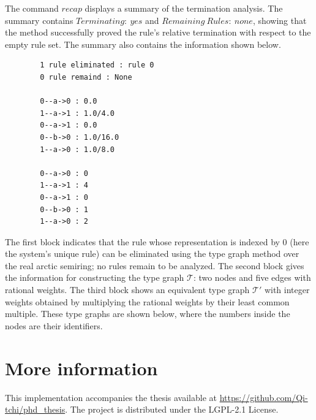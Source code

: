 The command \colorbox{Ivory2}{$recap$} displays a summary of the termination analysis. The summary contains \colorbox{Ivory2}{$Terminating:\ yes$} and \colorbox{Ivory2}{$Remaining\ Rules:\ none$}, showing that the method successfully proved the rule's relative termination with respect to the empty rule set. 
The summary also contains the information shown below.
\begin{center}
    \begin{lstlisting} 
        1 rule eliminated : rule 0 
        0 rule remaind : None

        0--a->0 : 0.0
        1--a->1 : 1.0/4.0 
        0--a->1 : 0.0
        0--b->0 : 1.0/16.0 
        1--a->0 : 1.0/8.0 

        0--a->0 : 0
        1--a->1 : 4
        0--a->1 : 0
        0--b->0 : 1
        1--a->0 : 2
    \end{lstlisting}
\end{center}
The first block indicates that the rule whose representation is indexed by \colorbox{Ivory2}{0} (here the system's unique rule) can be eliminated using the type graph method over the real arctic semiring; no rules remain to be analyzed. The second block gives the information for constructing the type graph $\mathcal{T}$: two nodes and five edges with rational weights. The third block shows an equivalent type graph $\mathcal{T}'$ with integer weights obtained by multiplying the rational weights by their least common multiple. These type graphs are shown below, where the numbers inside the nodes are their identifiers.
\begin{center}
\end{center}

\section{More information}
This implementation accompanies the thesis available at \url{https://github.com/Qi-tchi/phd_thesis}. The project is distributed under the LGPL-2.1 License.